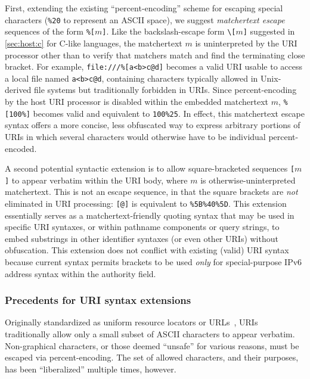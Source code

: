 First, extending the existing ``percent-encoding'' scheme
for escaping special characters
(\eg \verb|%20| to represent an ASCII space),
we suggest \emph{matchertext escape} sequences
of the form \verb|%[|$m$\verb|]|.
Like the backslash-escape form \verb|\[|$m$\verb|]|
suggested in \cref{sec:host:c} for C-like languages,
the matchertext $m$ is uninterpreted by the URI processor
other than to verify that matchers match
and find the terminating close bracket.
For example, \verb|file:///%[a<b>c@d]| becomes
a valid URI usable to access a local file named \verb|a<b>c@d|,
containing characters typically allowed in Unix-derived file systems
but traditionally forbidden in URIs.
Since percent-encoding by the host URI processor
is disabled within the embedded matchertext $m$,
\verb|%[100%]| becomes valid and equivalent to \verb|100%25|.
In effect, this matchertext escape syntax offers
a more concise, less obfuscated way to express arbitrary portions of URIs
in which several characters
would otherwise have to be individual percent-encoded.

A second potential syntactic extension is to allow
square-bracketed sequences \verb|[|$m$\verb|]|
to appear verbatim within the URI body,
where $m$ is otherwise-uninterpreted matchertext.
This is not an escape sequence,
in that the square brackets are \emph{not} eliminated in URI processing:
\eg \verb|[@]| is equivalent to \verb|%5B%40%5D|.
This extension essentially serves as a matchertext-friendly quoting syntax
that may be used in specific URI syntaxes,
or within pathname components or query strings,
to embed substrings in other identifier syntaxes (or even other URIs)
without obfuscation.
This extension does not conflict with existing (valid) URI syntax
because current syntax permits brackets to be used \emph{only}
for special-purpose IPv6 address syntax within the authority field.


\subsubsection{Precedents for URI syntax extensions}

Originally standardized as uniform resource locators or URLs~\cite{rfc1738},
URIs traditionally allow only a small subset of ASCII characters
to appear verbatim.
Non-graphical characters,
or those deemed ``unsafe'' for various reasons,
must be escaped via percent-encoding.
The set of allowed characters, and their purposes,
has been ``liberalized'' multiple times, however.

